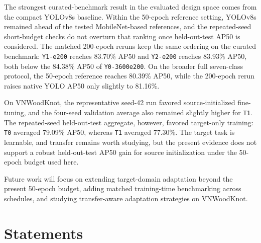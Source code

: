 \documentclass[cmc,article,submit,moreauthors,pdftex]{Definitions/tsp}
\begin{document}
The strongest curated-benchmark result in the evaluated design space comes from the compact YOLOv8s baseline. Within the 50-epoch reference setting, YOLOv8s remained ahead of the tested MobileNet-based references, and the repeated-seed short-budget checks do not overturn that ranking once held-out-test AP50 is considered. The matched 200-epoch reruns keep the same ordering on the curated benchmark: \texttt{Y1-e200} reaches 83.70\% AP50 and \texttt{Y2-e200} reaches 83.93\% AP50, both below the 84.38\% AP50 of \texttt{Y0-3600e200}. On the broader full seven-class protocol, the 50-epoch reference reaches 80.39\% AP50, while the 200-epoch rerun raises native YOLO AP50 only slightly to 81.16\%.

On VNWoodKnot, the representative seed-42 run favored source-initialized fine-tuning, and the four-seed validation average also remained slightly higher for \texttt{T1}. The repeated-seed held-out-test aggregate, however, favored target-only training: \texttt{T0} averaged 79.09\% AP50, whereas \texttt{T1} averaged 77.30\%. The target task is learnable, and transfer remains worth studying, but the present evidence does not support a robust held-out-test AP50 gain for source initialization under the 50-epoch budget used here.

Future work will focus on extending target-domain adaptation beyond the present 50-epoch budget, adding matched training-time benchmarking across schedules, and studying transfer-aware adaptation strategies on VNWoodKnot.





\section{Statements} \label{sect:s5}

\end{document}
